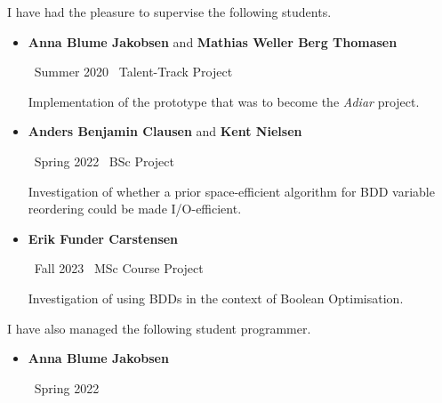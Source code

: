
I have had the pleasure to supervise the following students.

\medskip

\begin{itemize}

\item {\color{accent} \textbf{Anna Blume Jakobsen} and \textbf{Mathias Weller Berg Thomasen}}

  \smallskip

  \faCalendar\ Summer 2020 \hspace{82pt} \faGraduationCap\ Talent-Track Project

  \medskip

  Implementation of the prototype that was to become the \emph{Adiar} project.

  \medskip

\item {\color{accent} \textbf{Anders Benjamin Clausen} and \textbf{Kent Nielsen}}

  \smallskip

  \faCalendar\ Spring 2022 \hspace{90pt} \faGraduationCap\ BSc Project

  \medskip

  Investigation of whether a prior space-efficient algorithm for BDD variable
  reordering could be made I/O-efficient.

  \medskip

\item {\color{accent} \textbf{Erik Funder Carstensen}}

  \smallskip

  \faCalendar\ Fall 2023 \hspace{101pt} \faGraduationCap\ MSc Course Project

  \medskip

  Investigation of using BDDs in the context of Boolean Optimisation.
\end{itemize}

\smallskip

I have also managed the following student programmer.

\medskip

\begin{itemize}
\item {\color{accent} \textbf{Anna Blume Jakobsen}}

  \smallskip

  \faCalendar \ Spring 2022
\end{itemize}
